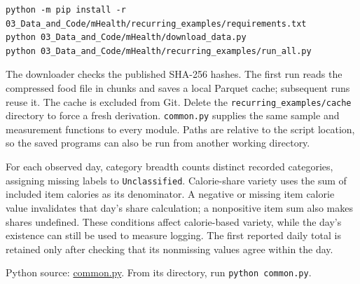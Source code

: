 \begin{Verbatim}[breaklines,breakanywhere,fontsize=\small]
python -m pip install -r 03_Data_and_Code/mHealth/recurring_examples/requirements.txt
python 03_Data_and_Code/mHealth/download_data.py
python 03_Data_and_Code/mHealth/recurring_examples/run_all.py
\end{Verbatim}

The downloader checks the published SHA-256 hashes. The first run reads
the compressed food file in chunks and saves a local Parquet cache;
subsequent runs reuse it. The cache is excluded from Git. Delete the
\texttt{recurring\_examples/cache} directory to force a fresh
derivation. \texttt{common.py} supplies the same sample and measurement
functions to every module. Paths are relative to the script location, so
the saved programs can also be run from another working directory.

For each observed day, category breadth counts distinct recorded
categories, assigning missing labels to \texttt{Unclassified}.
Calorie-share variety uses the sum of included item calories as its
denominator. A negative or missing item calorie value invalidates that
day's share calculation; a nonpositive item sum also makes shares
undefined. These conditions affect calorie-based variety, while the
day's existence can still be used to measure logging. The first reported
daily total is retained only after checking that its nonmissing values
agree within the day.

\FloatBarrier
{}
Python source:
\href{../03_Data_and_Code/mHealth/recurring_examples/common.py}{common.py}.
From its directory, run \texttt{python\ common.py}.


